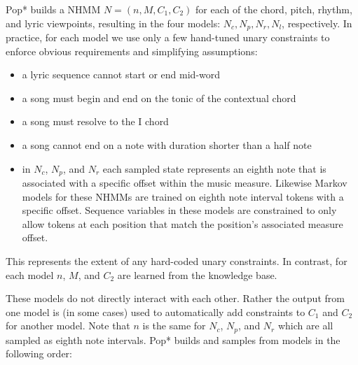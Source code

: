 \documentclass[phd,electronic,oneside,twosidetoc,letterpaper,chaptercenter,parttop,lof,lot]{byumsphd}
\begin{document}
Pop* builds a NHMM $N = (n, M, C_1, C_2)$ for each of the chord, pitch, rhythm, and lyric viewpoints, resulting in the four models: $N_c, N_p, N_r, N_l$, respectively. In practice, for each model we use only a few hand-tuned unary constraints to enforce obvious requirements and simplifying assumptions:
\begin{itemize}
\item a lyric sequence cannot start or end mid-word
\item a song must begin and end on the tonic of the contextual chord
\item a song must resolve to the I chord
\item a song cannot end on a note with duration shorter than a half note
\item in $N_c$, $N_p$, and $N_r$ each sampled state represents an eighth note that is associated with a specific offset within the music measure. Likewise Markov models for these NHMMs are trained on eighth note interval tokens with a specific offset. Sequence variables in these models are constrained to only allow tokens at each position that match the position's associated measure offset.
\end{itemize}
\noindent This represents the extent of any hard-coded unary constraints. In contrast, for each model $n$, ${M}$, and ${C_2}$ are learned from the knowledge base.

These models do not directly interact with each other. Rather the output from one model is (in some cases) used to automatically add constraints to $C_1$ and $C_2$ for another model. Note that $n$ is the same for $N_c$, $N_p$, and $N_r$ which are all sampled as eighth note intervals. Pop* builds and samples from models in the following order:
\end{document}
